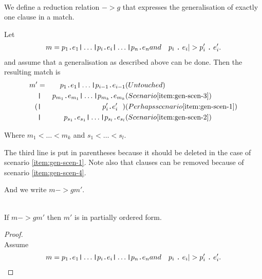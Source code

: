 \begin{definition}[Generalisation, $->g$]\ \\
\label{def:gener-match}
  We define a reduction relation $->g$ that expresses the
  generalisation of exactly one clause in a match.

  Let
  \begin{eqnarray*}[rqTcql]
    m = p_1 \texttt{.} e_1 \texttt{|} \ldots \texttt{|} p_i \texttt{.} e_i
    \texttt{|} \ldots \texttt{|} p_n \texttt{.} e_n & and & \clause{p_i}{e_i} |> \clause{p'_i}{e'_i}.
  \end{eqnarray*}
  and assume that a generalisation as described above can be done. Then the
  resulting match is
  \begin{eqnarray*}[rclqqqTl]
    m' &=& p_1 \texttt{.} e_1 \texttt{|} \ldots \texttt{|} p_{i-1} \texttt{.}
    e_{i-1} & (Untouched)\label{eq:gen-1}\\
    &\texttt{|}& p_{m_1} \texttt{.} e_{m_1} \texttt{|} \ldots \texttt{|} p_{m_k}
    \texttt{.} e_{m_k} & (Scenario \ref{item:gen-scen-3})\label{eq:gen-2}\\
    (&\texttt{|}& p'_i \texttt{.} e'_i \ \ ) 
    & (Perhaps scenario \ref{item:gen-scen-1})\label{eq:gen-3}\\
    &\texttt{|}& p_{s_1} \texttt{.} e_{s_1} \texttt{|} \ldots \texttt{|} p_{s_l}
    \texttt{.} e_{s_l} & (Scenario \ref{item:gen-scen-2})\label{eq:gen-4}
  \end{eqnarray*}

  Where $m_1 < \ldots < m_k$ and $s_1 < \ldots < s_l$.

  The third line is put in parentheses because it should be deleted in the case
  of scenario \ref{item:gen-scen-1}. Note also that clauses can be removed
  because of scenario \ref{item:gen-scen-4}.

  And we write $m ->g m'$.

  \begin{lemma}\ \\
    If $m ->g m'$ then $m'$ is in partially ordered form.
  \end{lemma}
  \begin{proof}\ \\
    Assume
    \begin{eqnarray*}[rqTcql]
      m = p_1 \texttt{.} e_1 \texttt{|} \ldots \texttt{|} p_i \texttt{.} e_i
      \texttt{|} \ldots \texttt{|} p_n \texttt{.} e_n & and & \clause{p_i}{e_i} |> \clause{p'_i}{e'_i}.
    \end{eqnarray*}


\end{proof}
\end{definition}
